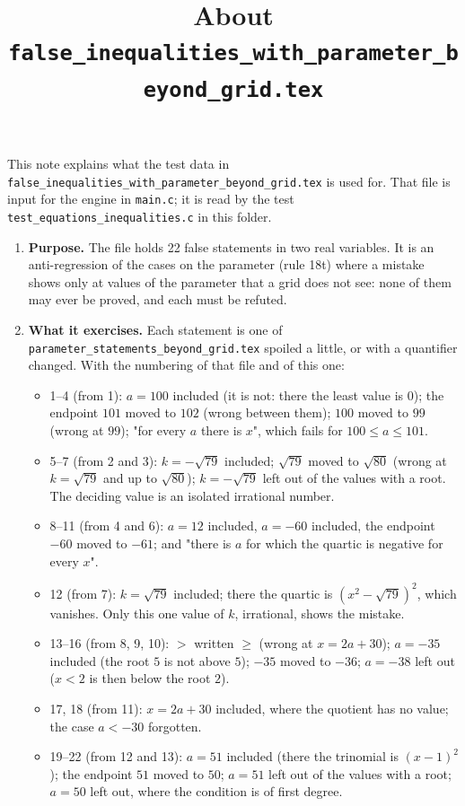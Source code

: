 \documentclass[11pt,a4paper]{article}
\title{About \texttt{false\_inequalities\_with\_parameter\_beyond\_grid.tex}}
\author{}
\date{}
\begin{document}
\maketitle
This note explains what the test data in \texttt{false\_inequalities\_with\_parameter\_beyond\_grid.tex} is used for. That file is input for the engine in \texttt{main.c}; it is read by the test \texttt{test\_equations\_inequalities.c} in this folder.

\begin{enumerate}
\item \textbf{Purpose.} The file holds 22 false statements in two real variables. It is an anti-regression of the cases on the parameter (rule 18t) where a mistake shows only at values of the parameter that a grid does not see: none of them may ever be proved, and each must be refuted.

\item \textbf{What it exercises.} Each statement is one of \texttt{parameter\_statements\_beyond\_grid.tex} spoiled a little, or with a quantifier changed. With the numbering of that file and of this one:
\begin{itemize}
\item 1--4 (from 1): $a = 100$ included (it is not: there the least value is $0$); the endpoint $101$ moved to $102$ (wrong between them); $100$ moved to $99$ (wrong at $99$); "for every $a$ there is $x$", which fails for $100 \le a \le 101$.
\item 5--7 (from 2 and 3): $k = -\sqrt{79}$ included; $\sqrt{79}$ moved to $\sqrt{80}$ (wrong at $k = \sqrt{79}$ and up to $\sqrt{80}$); $k = -\sqrt{79}$ left out of the values with a root. The deciding value is an isolated irrational number.
\item 8--11 (from 4 and 6): $a = 12$ included, $a = -60$ included, the endpoint $-60$ moved to $-61$; and "there is $a$ for which the quartic is negative for every $x$".
\item 12 (from 7): $k = \sqrt{79}$ included; there the quartic is $(x^{2} - \sqrt{79})^{2}$, which vanishes. Only this one value of $k$, irrational, shows the mistake.
\item 13--16 (from 8, 9, 10): $>$ written $\ge$ (wrong at $x = 2a + 30$); $a = -35$ included (the root $5$ is not above $5$); $-35$ moved to $-36$; $a = -38$ left out ($x < 2$ is then below the root $2$).
\item 17, 18 (from 11): $x = 2a + 30$ included, where the quotient has no value; the case $a < -30$ forgotten.
\item 19--22 (from 12 and 13): $a = 51$ included (there the trinomial is $(x - 1)^{2}$); the endpoint $51$ moved to $50$; $a = 51$ left out of the values with a root; $a = 50$ left out, where the condition is of first degree.
\end{itemize}


\end{enumerate}
\end{document}
